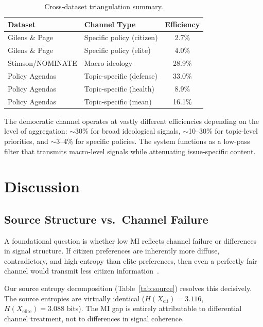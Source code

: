 \documentclass[twocolumn,10pt]{article}
\begin{document}
\begin{table}[t]
\centering
\caption{Cross-dataset triangulation summary.}
\label{tab:triangulation}
\begin{tabular}{@{}llc@{}}
\toprule
Dataset & Channel Type & Efficiency \\
\midrule
Gilens \& Page & Specific policy (citizen) & 2.7\% \\
Gilens \& Page & Specific policy (elite) & 4.0\% \\
Stimson/NOMINATE & Macro ideology & 28.9\% \\
Policy Agendas & Topic-specific (defense) & 33.0\% \\
Policy Agendas & Topic-specific (health) & 8.9\% \\
Policy Agendas & Topic-specific (mean) & 16.1\% \\
\bottomrule
\end{tabular}
\end{table}

The democratic channel operates at vastly different efficiencies depending on the level of aggregation: $\sim$30\% for broad ideological signals, $\sim$10--30\% for topic-level priorities, and $\sim$3--4\% for specific policies.  The system functions as a low-pass filter that transmits macro-level signals while attenuating issue-specific content.

\section{Discussion}
\label{sec:discussion}

\subsection{Source Structure vs.\ Channel Failure}

A foundational question is whether low MI reflects channel failure or differences in signal structure.  If citizen preferences are inherently more diffuse, contradictory, and high-entropy than elite preferences, then even a perfectly fair channel would transmit less citizen information~\citep{cover2006}.

Our source entropy decomposition (Table~\ref{tab:source}) resolves this decisively.  The source entropies are virtually identical ($H(X_\text{cit}) = 3.116$, $H(X_\text{elite}) = 3.088$ bits).  The MI gap is entirely attributable to differential channel treatment, not to differences in signal coherence.
\end{document}
